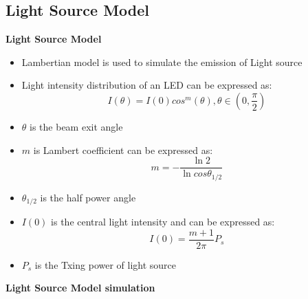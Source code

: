 \documentclass[9pt, dvipsnames]{beamer} %
\begin{document}
\subsection{Light Source Model}
   \begin{frame}{\textbf {Light Source Model}}
             \begin{itemize}
              \item Lambertian model is used to simulate the emission of Light source
              \item Light intensity distribution of an LED can be expressed as:
              \begin{equation}
                  I(\theta)=I(0)cos^m(\theta),\theta\in(0,\frac{\pi}{2})
              \end{equation}
              \item $\theta$ is the beam exit angle
              \item $m$ is Lambert coefficient can be expressed as:
              \begin{equation}
                  m=-\frac{\ln 2}{\ln cos\theta_{1/2}}
              \end{equation}
              \item $\theta_{1/2}$ is the half power angle
              \item $I(0)$ is the central light intensity and can be expressed as:
              \begin{equation}
                  I(0)=\frac{m+1}{2\pi}P_s
              \end{equation}
              \item $P_s$ is the Txing power of light source
             \end{itemize}
   \end{frame}

 
   \begin{frame}{\textbf {Light Source Model simulation}}
          
             \begin{figure}
             \end{figure}
   \end{frame}
   
\end{document}
